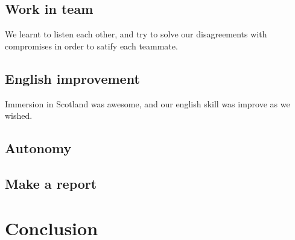 \documentclass{scrreprt}
\begin{document}
		\section{Work in team}
		We learnt to listen each other, and try to solve our disagreements with compromises in order to satify each teammate.
		\section{English improvement}
		Immersion in Scotland was awesome, and our english skill was improve as we wished.
		\section{Autonomy}
		
		\section{Make a report}

		\chapter*{Conclusion} %
		
\end{document}
